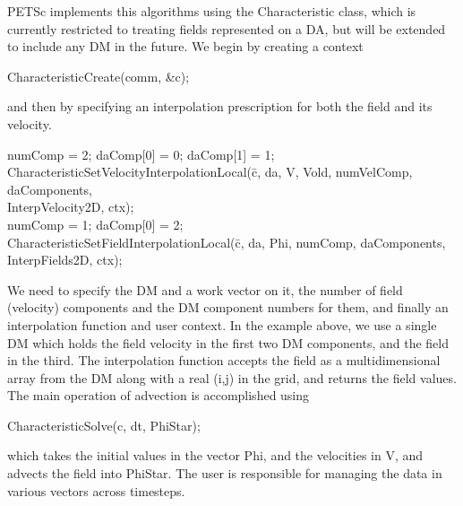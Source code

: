\documentclass[twoside,12pt]{../sty/report_petsc}
\begin{document}
    PETSc implements this algorithms using the Characteristic class, which is currently restricted to treating fields
represented on a DA, but will be extended to include any DM in the future. We begin by creating a context
\begin{tabbing}
  CharacteristicCreate(comm, \&c);
\end{tabbing}
and then by specifying an interpolation prescription for both the field and its velocity.
\begin{tabbing}
  numComp = 2; daComp[0] = 0; daComp[1] = 1; \\
  CharacteristicSetVelocityInterpolationLocal(\=c, da, V, Vold, numVelComp, daComponents,\\
                                              \>InterpVelocity2D, ctx); \\
  numComp = 1; daComp[0] = 2; \\
  CharacteristicSetFieldInterpolationLocal(\=c, da, Phi, numComp, daComponents,\\
                                           \>InterpFields2D, ctx);
\end{tabbing}
We need to specify the DM and a work vector on it, the number of field (velocity) components and the DM component
numbers for them, and finally an interpolation function and user context. In the example above, we use a single DM which
holds the field velocity in the first two DM components, and the field in the third. The interpolation function accepts
the field as a multidimensional array from the DM along with a real (i,j) in the grid, and returns the field values. The
main operation of advection is accomplished using
\begin{tabbing}
  CharacteristicSolve(c, dt, PhiStar);
\end{tabbing}
which takes the initial values in the vector Phi, and the velocities in V, and advects the field into PhiStar. The user
is responsible for managing the data in various vectors across timesteps.
\end{document}
